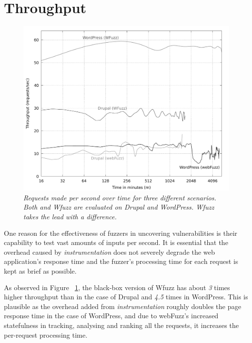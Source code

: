 \section{Throughput}

\begin{figure}[!htb]
  \centering \includegraphics[width=\linewidth]{figures/plot_throughput.pdf}
  \captionsetup{justification=centering}  
  \caption[Throughput of \pname{} and Wfuzz when fuzzing Drupal and WordPress]{\textit{Requests made per second over time for three different scenarios. Both \pname{} and Wfuzz are evaluated on Drupal and WordPress. Wfuzz takes the lead with a difference.}} 
  \label{fig:plot_throughput}
\end{figure}

One reason for the effectiveness of fuzzers in uncovering vulnerabilities is their capability to test vast amounts of inputs per second. It is essential that the overhead caused by \emph{instrumentation} does not severely degrade the web application's response time and the fuzzer's processing time for each request is kept as brief as possible.

As observed in Figure ~\ref{fig:plot_throughput}, the black-box version of Wfuzz has about \emph{3} times higher throughput than \pname{} in the case of Drupal and \emph{4.5} times in WordPress. This is plausible as the overhead added from \emph{instrumentation} roughly doubles the page response time in the case of WordPress, and due to webFuzz's increased statefulness in tracking, analysing and ranking all the requests, it increases the per-request processing time.

